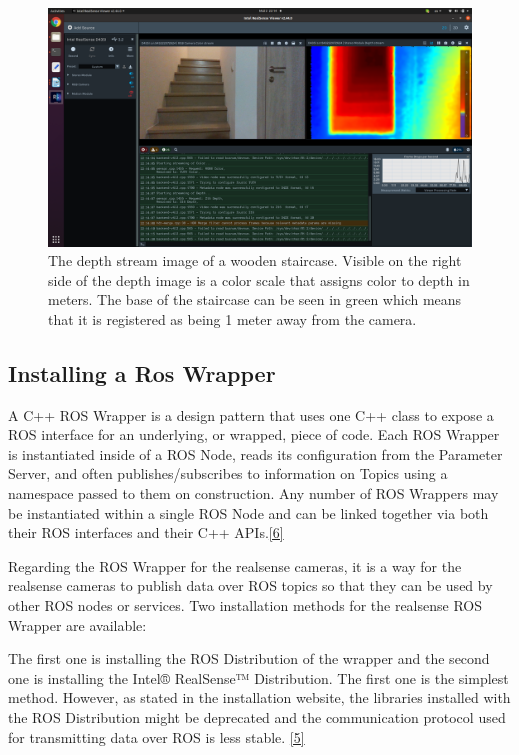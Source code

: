 \documentclass{article}
\begin{document}
\begin{figure}[h] %
    \centering
	\includegraphics[width=\textwidth,height=\textheight,keepaspectratio]{report1-img007.png} %
	\caption{The depth stream image of a wooden staircase. Visible on the right side of the depth image is a color scale that assigns color to depth in meters. The base of the staircase can be seen in green which means that it is registered as being 1 meter away from the camera.}
\end{figure}

\clearpage

\subsection{Installing a Ros Wrapper}

A C++ ROS Wrapper is a design pattern that uses one C++ class to expose a ROS interface for an underlying, or wrapped, piece of code. Each ROS Wrapper is instantiated inside of a ROS Node, reads its configuration from the Parameter Server, and often publishes/subscribes to information on Topics using a namespace passed to them on construction. Any number of ROS Wrappers may be instantiated within a single ROS Node and can be linked together via both their ROS interfaces and their C++ APIs.\href{http://wiki.ros.org/navigation/ROS_Wrappers}{[6]}

Regarding the ROS Wrapper for the realsense cameras, it is a way for the realsense cameras to publish data over ROS topics so that they can be used by other ROS nodes or services.
Two installation methods for the realsense ROS Wrapper are available:

The first one is installing the ROS Distribution of the wrapper and the second one is installing the Intel® RealSense™ Distribution. The first one is the simplest method. However, as stated in the installation website, the libraries installed with the ROS Distribution might be deprecated and the communication protocol used for transmitting data over ROS is less stable. \href{https://github.com/IntelRealSense/realsense-ros}{[5]}
\end{document}
